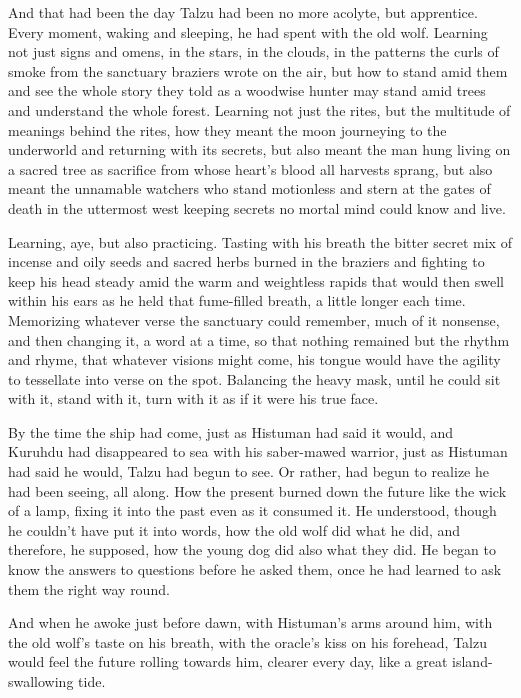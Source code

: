 \noindent And that had been the day Talzu had been no more acolyte, but apprentice. Every moment, waking and sleeping, he had spent with the old wolf. Learning not just signs and omens, in the stars, in the clouds, in the patterns the curls of smoke from the sanctuary braziers wrote on the air, but how to stand amid them and see the whole story they told as a woodwise hunter may stand amid trees and understand the whole forest. Learning not just the rites, but the multitude of meanings behind the rites, how they meant the moon journeying to the underworld and returning with its secrets, but also meant the man hung living on a sacred tree as sacrifice from whose heart's blood all harvests sprang, but also meant the unnamable watchers who stand motionless and stern at the gates of death in the uttermost west keeping secrets no mortal mind could know and live.

Learning, aye, but also practicing. Tasting with his breath the bitter secret mix of incense and oily seeds and sacred herbs burned in the braziers and fighting to keep his head steady amid the warm and weightless rapids that would then swell within his ears as he held that fume-filled breath, a little longer each time. Memorizing whatever verse the sanctuary could remember, much of it nonsense, and then changing it, a word at a time, so that nothing remained but the rhythm and rhyme, that whatever visions might come, his tongue would have the agility to tessellate into verse on the spot. Balancing the heavy mask, until he could sit with it, stand with it, turn with it as if it were his true face.

By the time the ship had come, just as Histuman had said it would, and Kuruhdu had disappeared to sea with his saber-mawed warrior, just as Histuman had said he would, Talzu had begun to see. Or rather, had begun to realize he had been seeing, all along. How the present burned down the future like the wick of a lamp, fixing it into the past even as it consumed it. He understood, though he couldn't have put it into words, how the old wolf did what he did, and therefore, he supposed, how the young dog did also what they did. He began to know the answers to questions before he asked them, once he had learned to ask them the right way round.

And when he awoke just before dawn, with Histuman's arms around him, with the old wolf's taste on his breath, with the oracle's kiss on his forehead, Talzu would feel the future rolling towards him, clearer every day, like a great island-swallowing tide.

